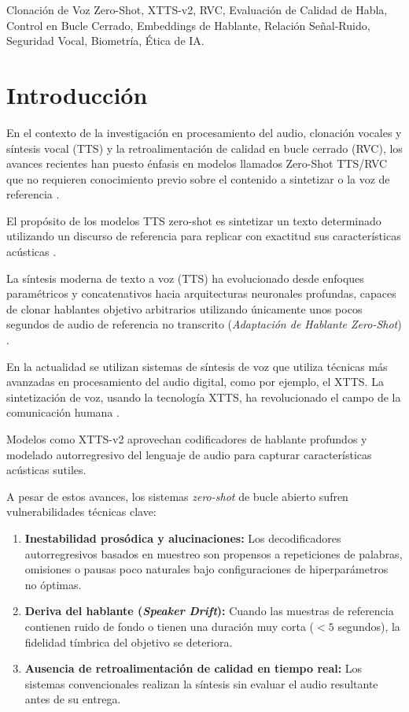 \documentclass[conference]{IEEEtran}
\begin{document}
\begin{IEEEkeywords}
Clonación de Voz Zero-Shot, XTTS-v2, RVC, Evaluación de Calidad de Habla, Control en Bucle Cerrado, Embeddings de Hablante, Relación Señal-Ruido, Seguridad Vocal, Biometría, Ética de IA.
\end{IEEEkeywords}

\section{Introducción}

En el contexto de la investigación en procesamiento del audio, clonación vocales y síntesis vocal (TTS) y la retroalimentación de calidad en bucle cerrado (RVC), los avances recientes han puesto énfasis en modelos llamados Zero-Shot TTS/RVC  que no requieren conocimiento previo sobre el contenido a sintetizar o la voz de referencia \cite{casanova2022yourtts}. 

El propósito de los modelos TTS zero-shot es sintetizar un texto determinado utilizando un discurso de referencia para replicar con exactitud sus características acústicas \cite{zhang2025advancing}.

La síntesis moderna de texto a voz (TTS) ha evolucionado desde enfoques paramétricos y concatenativos hacia arquitecturas neuronales profundas, capaces de clonar hablantes objetivo arbitrarios utilizando únicamente unos pocos segundos de audio de referencia no transcrito (\emph{Adaptación de Hablante Zero-Shot}) \cite{shen2018natural}. 

En la actualidad se utilizan sistemas de síntesis de voz que utiliza técnicas más avanzadas en procesamiento del audio digital, como por ejemplo, el XTTS. La sintetización de voz, usando la tecnología XTTS, ha revolucionado el campo de la comunicación humana \cite{rabiner2007introduction}.

Modelos como XTTS-v2 \cite{casanova2024xtts} aprovechan codificadores de hablante profundos y modelado autorregresivo del lenguaje de audio para capturar características acústicas sutiles.

A pesar de estos avances, los sistemas \emph{zero-shot} de bucle abierto sufren vulnerabilidades técnicas clave:
\begin{enumerate}
    \item \textbf{Inestabilidad prosódica y alucinaciones:} Los decodificadores autorregresivos basados en muestreo son propensos a repeticiones de palabras, omisiones o pausas poco naturales bajo configuraciones de hiperparámetros no óptimas.
    \item \textbf{Deriva del hablante (\emph{Speaker Drift}):} Cuando las muestras de referencia contienen ruido de fondo o tienen una duración muy corta ($<5$ segundos), la fidelidad tímbrica del objetivo se deteriora.
    \item \textbf{Ausencia de retroalimentación de calidad en tiempo real:} Los sistemas convencionales realizan la síntesis sin evaluar el audio resultante antes de su entrega.
\end{enumerate}
\end{document}
